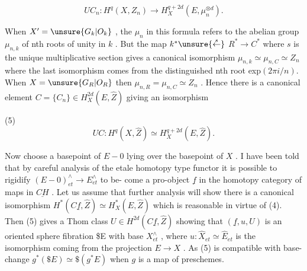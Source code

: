 
\margin{\checkmark}\[ UC_n : H^q(X, Z_n) \to H^{q+2d}_X (E, \mu_n^{\otimes d}) . \]

When $X^\prime = \unsure{G_k|O_k}$ , the $\mu_n$ in this formula refers to the abelian
group $\mu_{n,k}$ of nth roots of unity in $k$ . But the map $k^* \unsure{\overset{s}{\leftarrow}}$
$R^* \to C^*$ where $s$ is the unique multiplicative section gives a
canonical isomorphism $\mu_{n,k} \simeq \mu_{n,C} \simeq Z_n$ where the last isomorphism
comes from the distinguished nth root exp$(2\pi i/n)$. When $X = \unsure{G_R|O_R}$
then $\mu_{n,R} = \mu_{n,C} \simeq Z_n$ . Hence there is a canonical element
$C = \{C_n\} \in H^{2d}_X(E, \hat{Z})$ giving an isomorphism

(5) \[ UC : H^q(X, \hat{Z}) \simeq H^{q+2d}_X(E, \hat{Z}) . \]

Now choose a basepoint of $E - 0$ lying over the basepoint of $X$ .
I have been told that by careful analysis of the etale homotopy
type functor it is possible to rigidify $(E - 0)^\wedge_{et} \to E^\wedge_{et}$ to be-%
come a pro-object $\underline{f}$ in the homotopy category of maps in $\underline{CH}$ .
Let us assume that further analysis will show there is a canonical
isomorphism $H^*(C\underline{f}, \hat{Z}) \simeq H^*_X(E, \hat{Z})$ which is reasonable in virtue of
(4). Then (5) gives a Thom class $U \in H^{2d}(C\underline{f}, \hat{Z})$ showing that
$(\underline{f},u,U)$ is an oriented sphere fibration \$E with base $X^\wedge_{et}$ ,
where $u : \hat{X}_{et} \simeq \hat{E}_{et}$ is the isomorphism coming from the projection
$E \to X$ . As (5) is compatible with base-change $g^*(\$E) \simeq \$(g^*E)$
when $g$ is a map of preschemes.

